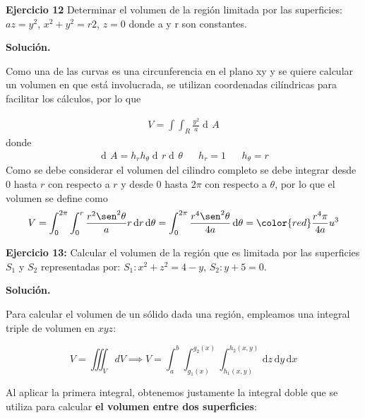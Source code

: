 \documentclass[12pt]{article}
\DeclareMathOperator{\di}{d\!}
\begin{document}
\noindent \textbf{Ejercicio 12} Determinar el volumen de la región limitada por
 las superficies: $az = y^2$, $x^2+y^2 = r2$, $z=0$ donde a y r son constantes.

\vspace{5mm}

\noindent \textbf{Solución.}

\vspace{3mm}

Como una de las curvas es una circunferencia en el plano xy y se quiere calcular un
volumen en que está involucrada, se utilizan coordenadas cilíndricas para facilitar
los cálculos, por lo que 

\begin{align*}
	V = \int\int_{R} \frac{y^2}{a} \di A
\end{align*}
donde
\begin{align*}
	\di A = h_{r}h_{\theta} \di r \di \theta && h_{r}=1 && h_{\theta} = r
\end{align*} 
Como se debe considerar el volumen del cilindro completo se debe integrar desde
$0$ hasta $r$ con respecto a $r$ y desde $0$ hasta $2\pi$ con 
respecto a $\theta$, por lo que el volumen se define
como
\begin{align*}
	V = \int_{0}^{2\pi}\int_{0}^{r} \frac{r^2\sen^2\theta}{a}r \di r \di \theta
	= \int_0^{2\pi} \frac{r^4\sen^2\theta}{4a} \di \theta =\color{red} \frac{r^4\pi}{4a} u^3	
\end{align*} 




\noindent \textbf{Ejercicio 13:} Calcular el volumen de la región que es limitada por las superficies $S_1$ y $S_2$ representadas por: $S_1:x^2+z^2=4-y$, $S_2:y+5=0$.

\vspace{5mm}

\noindent \textbf{Solución.}

\vspace{3mm}

\noindent Para calcular el volumen de un sólido dada una región, empleamos una integral triple de volumen en $xyz$:

\begin{equation}\label{eqn:13-1}\tag{1}
	V = \iiint_V dV \implies V = \int_{a}^{b}\int_{g_1(x)}^{g_2(x)}\int_{h_1(x,y)}^{h_2(x,y)}\, \mathrm{d}z\,\mathrm{d}y\,\mathrm{d}x
\end{equation}

\noindent Al aplicar la primera integral, obtenemos justamente la integral doble que se utiliza para calcular \textbf{el volumen entre dos superficies}:
\end{document}
